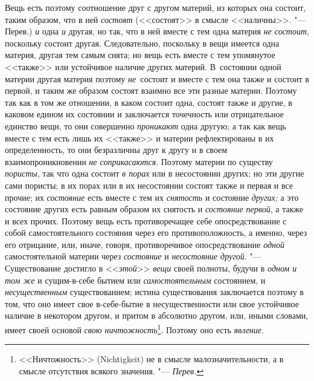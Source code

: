 Вещь есть поэтому соотношение друг с другом материй, из которых она состоит,
таким образом, что в ней {\em состоят} (<<состоят>> в
смысле <<наличны>>. "--- Перев.) {\em и} одна
{\em и} другая, но так, что в ней вместе с тем одна
материя {\em не состоит}, поскольку состоит другая.
Следовательно, поскольку в вещи имеется одна материя, другая тем самым
снята; но вещь есть вместе с тем упомянутое <<также>> или устойчивое наличие
других материй. В~состоянии одной материи другая материя поэтому
{\em не}~состоит и вместе с тем она также и состоит в
первой, и таким же образом состоят взаимно все эти разные материи. Поэтому
так как в том же отношении, в каком состоит одна, состоят также и другие, в
каковом едином их состоянии и заключается точечность или отрицательное
единство вещи, то они совершенно {\em проникают} одна
другую; а так как вещь вместе с тем есть лишь их <<также>> и материи
рефлектированы в их определенность, то они безразличны друг к другу и в
своем взаимопроникновении {\em не соприкасаются}.
Поэтому материи по существу {\em пористы}, так что одна
состоит {\em в порах} или в несостоянии других; но эти
другие сами пористы; в их порах или в их несостоянии состоят также и первая
и все прочие; их {\em состояние} есть вместе с тем их
{\em снятость} и состояние {\em других;} а это состояние других есть равным
образом их снятость и {\em состояние первой}, а также и
всех прочих. Поэтому вещь есть противоречащее себе опосредствование с собой
самостоятельного состояния через его противоположность, а именно, через его
отрицание, или, иначе, говоря, противоречивое опосредствование
{\em одной} самостоятельной материи через {\em состояние} и {\em несостояние
другой}. "--- Существование достигло в <<{\em этой}>> {\em вещи} своей
полноты, будучи в {\em одном и том же} и сущим-в-себе
бытием или {\em самостоятельным} состоянием, и
{\em несущественным} существованием; истина
существования заключается поэтому в том, что оно имеет свое в-себе-бытие в
несущественности или свое устойчивое наличие в некотором другом, и притом в
абсолютно другом, или, иными словами, имеет своей основой
{\em свою ничтожность}\footnote{<<Ничтожность>> (Nichtig\-keit) не
в смысле малозначительности, а в смысле отсутствия всякого
значения. "--- {\em Перев.}}. Поэтому оно есть {\em явление}.


